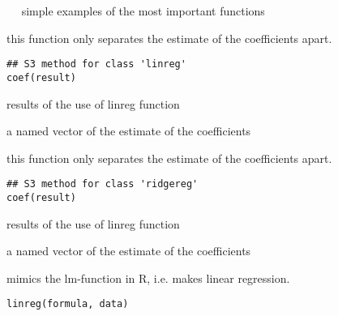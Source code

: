 \documentclass[a4paper]{book}
\begin{document}
%
\begin{Examples}
\begin{ExampleCode}
~~ simple examples of the most important functions ~~
\end{ExampleCode}
\end{Examples}
%
\begin{Description}\relax
this function only separates the estimate of the coefficients apart.
\end{Description}
%
\begin{Usage}
\begin{verbatim}
## S3 method for class 'linreg'
coef(result)
\end{verbatim}
\end{Usage}
%
\begin{Arguments}
\begin{ldescription}
\item[\code{what}] results of the use of linreg function
\end{ldescription}
\end{Arguments}
%
\begin{Value}
a named vector of the estimate of the coefficients
\end{Value}
%
\begin{Description}\relax
this function only separates the estimate of the coefficients apart.
\end{Description}
%
\begin{Usage}
\begin{verbatim}
## S3 method for class 'ridgereg'
coef(result)
\end{verbatim}
\end{Usage}
%
\begin{Arguments}
\begin{ldescription}
\item[\code{what}] results of the use of linreg function
\end{ldescription}
\end{Arguments}
%
\begin{Value}
a named vector of the estimate of the coefficients
\end{Value}
%
\begin{Description}\relax
mimics the lm-function in R, i.e. makes linear regression.
\end{Description}
%
\begin{Usage}
\begin{verbatim}
linreg(formula, data)
\end{verbatim}
\end{Usage}
\end{document}
